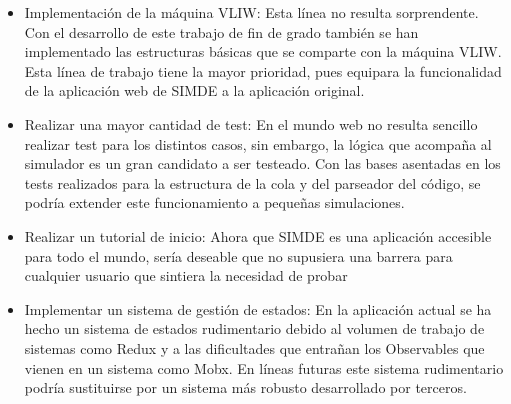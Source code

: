 \begin{itemize}

\item Implementación de la máquina VLIW: Esta línea no resulta sorprendente. Con el desarrollo de este 
trabajo de fin de grado también se han implementado las estructuras básicas que se comparte con la máquina 
VLIW. Esta línea de trabajo tiene la mayor prioridad, pues equipara la funcionalidad de la aplicación web de 
SIMDE a la aplicación original.

\item Realizar una mayor cantidad de test: En el mundo web no resulta sencillo realizar test 
para los distintos casos, sin embargo, la lógica que acompaña al simulador es un gran candidato a 
ser testeado. Con las bases asentadas en los tests realizados para la estructura de la cola y 
del parseador del código, se podría extender este funcionamiento a pequeñas simulaciones.

\item Realizar un tutorial de inicio: Ahora que SIMDE es una aplicación accesible para todo el mundo, sería
deseable que no supusiera una barrera para cualquier usuario que sintiera la necesidad de probar 

\item Implementar un sistema de gestión de estados: En la aplicación actual se ha hecho un sistema
 de estados rudimentario debido al volumen de trabajo de sistemas como Redux y a las dificultades 
 que entrañan los Observables que vienen en un sistema como Mobx. En líneas futuras este sistema
  rudimentario podría sustituirse por un sistema más robusto desarrollado por terceros.

\end{itemize}
